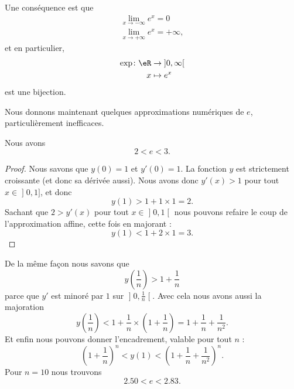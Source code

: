 Une conséquence est que 
\begin{subequations}    \label{EqLOIUooHxnEDn}
    \begin{align}
        \lim_{x\to -\infty}  e^{x}=0\\
        \lim_{x\to +\infty}  e^{x}=+\infty,
    \end{align}
\end{subequations}
et en particulier, 
\begin{equation}
    \begin{aligned}
    \exp\colon \eR&\to \mathopen] 0 , \infty \mathclose[ \\
        x&\mapsto  e^{x} 
    \end{aligned}
\end{equation}
est une bijection.

Nous donnons maintenant quelques approximations numériques de \( e\), particulièrement inefficaces.

\begin{lemma}
    Nous avons
    \begin{equation}
        2<e<3.
    \end{equation}
\end{lemma}

\begin{proof}
    Nous savons que \( y(0)=1\) et \( y'(0)=1\). La fonction \( y\) est strictement croissante (et donc sa dérivée aussi). Nous avons donc \( y'(x)>1\) pour tout \( x\in\mathopen] 0 , 1 \mathclose]\), et donc
    \begin{equation}
        y(1)>1+1\times 1=2.
    \end{equation}
    Sachant que \( 2>y'(x)\) pour tout \( x\in \mathopen] 0 , 1 \mathclose[\) nous pouvons refaire le coup de l'approximation affine, cette fois en majorant :
        \begin{equation}
            y(1)<1+2\times 1=3.
        \end{equation}
\end{proof}

De la même façon nous savons que
\begin{equation}
    y(\frac{1}{ n })>1+\frac{1}{ n }
\end{equation}
parce que \( y'\) est minoré par \( 1\) sur \( \mathopen] 0 , \frac{1}{ n } \mathclose[\). Avec cela nous avons aussi la majoration
\begin{equation}
    y(\frac{1}{ n })<1+\frac{1}{ n }\times \left( 1+\frac{1}{ n } \right)=1+\frac{1}{ n }+\frac{1}{ n^2 }.
\end{equation}
Et enfin nous pouvons donner l'encadrement, valable pour tout \( n\) :
\begin{equation}
    \left( 1+\frac{1}{ n } \right)^n<y(1)<\left( 1+\frac{1}{ n }+\frac{1}{ n^2 } \right)^n.
\end{equation}
Pour \( n=10\) nous trouvons
\begin{equation}
    2.50<e<2.83.
\end{equation}

